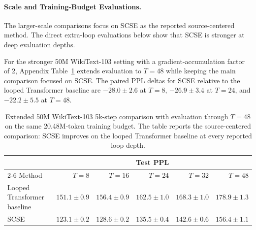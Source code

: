 \documentclass[letterpaper]{article} %
\newcommand{\SCSE}{\textsc{SCSE}}
\theoremstyle{remark}
\begin{document}
\paragraph{Scale and Training-Budget Evaluations.} The larger-scale comparisons focus on \SCSE{} as the reported source-centered method.  The direct extra-loop evaluations below show that \SCSE{} is stronger at deep evaluation depths.

For the stronger 50M WikiText-103 setting with a gradient-accumulation factor of 2, Appendix Table~\ref{tab:scale50m_x48} extends evaluation to $T=48$ while keeping the main comparison focused on \SCSE{}.  The paired PPL deltas for \SCSE{} relative to the looped Transformer baseline are $-28.0\pm2.6$ at $T=8$, $-26.9\pm3.4$ at $T=24$, and $-22.2\pm5.5$ at $T=48$.

\begin{table}[t!]
	\centering
	\scriptsize
	\begin{tabular}{lrrrrr}
		\toprule
		                            & \multicolumn{5}{c}{Test PPL}                                                                                                     \\
		\cmidrule(lr){2-6}
		Method                      & $T=8$                        & $T=16$                 & $T=24$                 & $T=32$                 & $T=48$                 \\
		\midrule
		Looped Transformer baseline & $151.1\pm0.9$                & $156.4\pm0.9$          & $162.5\pm1.0$          & $168.3\pm1.0$          & $178.9\pm1.3$          \\
		\SCSE{}                     & $\mathbf{123.1\pm0.2}$       & $\mathbf{128.6\pm0.2}$ & $\mathbf{135.5\pm0.4}$ & $\mathbf{142.6\pm0.6}$ & $\mathbf{156.4\pm1.1}$ \\
		\bottomrule
	\end{tabular}
	\caption{Extended 50M WikiText-103 5k-step comparison with evaluation through $T=48$ on the same 20.48M-token training budget.  The table reports the source-centered comparison: \SCSE{} improves on the looped Transformer baseline at every reported loop depth.}
	\label{tab:scale50m_x48}
\end{table}
\end{document}

